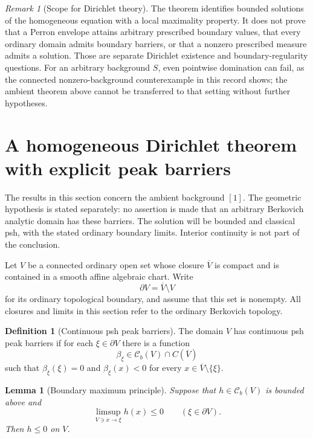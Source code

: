 \documentclass[11pt,a4paper]{article}
\numberwithin{equation}{section}
\newtheorem{lemma}[theorem]{Lemma}
\theoremstyle{definition}
\newtheorem{definition}[theorem]{Definition}
\theoremstyle{remark}
\newtheorem{remark}[theorem]{Remark}
\newcommand{\Cb}{\mathcal C_b}
\begin{document}
\begin{remark}[Scope for Dirichlet theory]
The theorem identifies bounded solutions of the homogeneous
equation with a local maximality property. It does not prove
that a Perron envelope attains arbitrary prescribed boundary
values, that every ordinary domain admits boundary barriers,
or that a nonzero prescribed measure admits a solution. Those
are separate Dirichlet existence and boundary-regularity
questions. For an arbitrary background $S$, even pointwise
domination can fail, as the connected nonzero-background
counterexample in this record shows; the ambient theorem above
cannot be transferred to that setting without further hypotheses.
\end{remark}



\section{A homogeneous Dirichlet theorem with explicit peak barriers}
\label{sec:r2-perron}

The results in this section concern the ambient background $[1]$.
The geometric hypothesis is stated separately: no assertion is
made that an arbitrary Berkovich analytic domain has these
barriers. The solution will be bounded and classical psh, with
the stated ordinary boundary limits. Interior continuity is not
part of the conclusion.

Let $V$ be a connected ordinary open set whose closure $\overline V$
is compact and is contained in a smooth affine algebraic chart.
Write
\[
 \partial V=\overline V\setminus V
\]
for its ordinary topological boundary, and assume that this set
is nonempty. All closures and limits in this section refer to
the ordinary Berkovich topology.

\begin{definition}[Continuous psh peak barriers]
\label{def:r2-peak-barriers}
The domain $V$ has continuous psh peak barriers if for each
$\xi\in\partial V$ there is a function
\[
 \beta_\xi\in \Cb(V)\cap C(\overline V)
\]
such that $\beta_\xi(\xi)=0$ and
$\beta_\xi(x)<0$ for every $x\in\overline V\setminus\{\xi\}$.
\end{definition}

\begin{lemma}[Boundary maximum principle]
\label{lem:r2-boundary-maximum}
Suppose that $h\in\Cb(V)$ is bounded above and
\[
 \limsup_{V\ni x\to\xi}h(x)\leq0
       \qquad(\xi\in\partial V).
\]
Then $h\leq0$ on $V$.
\end{lemma}
\end{document}
